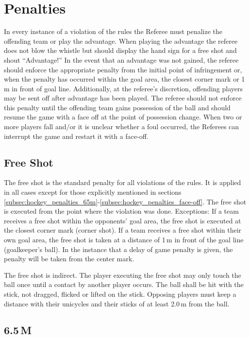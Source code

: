 \section{Penalties}

In every instance of a violation of the rules the Referee must penalize the offending team or play the advantage.
When playing the advantage the referee does not blow the whistle but should display the hand sign for a free shot and shout “Advantage!”
In the event that an advantage was not gained, the referee should enforce the appropriate penalty from the initial point of infringement or, when the penalty has occurred within the goal area, the closest corner mark or 1 m in front of goal line.
Additionally, at the referee’s discretion, offending players may be sent off after advantage has been played.
The referee should not enforce this penalty until the offending team gains possession of the ball and should resume the game with a face off at the point of possession change.
When two or more players fall and/or it is unclear whether a foul occurred, the Referees can interrupt the game and restart it with a face-off.


\subsection{Free Shot}

The free shot is the standard penalty for all violations of the rules.
It is applied in all cases except for those explicitly mentioned in sections \ref{subsec:hockey_penalties_65m}-\ref{subsec:hockey_penalties_face-off}.
The free shot is executed from the point where the violation was done.
Exceptions: If a team receives a free shot within the opponents' goal area, the free shot is executed at the closest corner mark (corner shot).
If a team receives a free shot within their own goal area, the free shot is taken at a distance of 1\,m in front of the goal line (goalkeeper's ball).
In the instance that a delay of game penalty is given, the penalty will be taken from the center mark.

The free shot is indirect.
The player executing the free shot may only touch the ball once until a contact by another player occurs.
The ball shall be hit with the stick, not dragged, flicked or lifted on the stick.
Opposing players must keep a distance with their unicycles and their sticks of at least 2.0\,m from the ball.

\subsection{6.5\,M \label{subsec:hockey_penalties_65m}}

